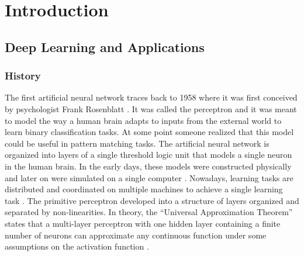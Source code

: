 
\chapter{Introduction} %

\label{Chapter1} %


\newcommand{\keyword}[1]{\textbf{#1}}
\newcommand{\tabhead}[1]{\textbf{#1}}
\newcommand{\code}[1]{\texttt{#1}}
\newcommand{\file}[1]{\texttt{\bfseries#1}}
\newcommand{\option}[1]{\texttt{\itshape#1}}


\section{Deep Learning and Applications}

\subsection{History}
The first artificial neural network traces back to 1958 where it was first conceived by psychologist Frank Rosenblatt \cite{perceptron}. It was called the perceptron and it was meant to model the way a human brain adapts to inputs from the external world to learn binary classification tasks. At some point someone realized that this model could be useful in pattern matching tasks. The artificial neural network is organized into layers of a single threshold logic unit that models a single neuron in the human brain. In the early days, these models were constructed physically and later on were simulated on a single computer \cite{mccarthy2006proposal}. Nowadays, learning tasks are distributed and coordinated on multiple machines to achieve a single learning task \cite{dean2012large}. The primitive perceptron developed into a structure of layers organized and separated by non-linearities. In theory, the “Universal Approximation Theorem” states that a multi-layer perceptron with one hidden layer containing a finite number of neurons can approximate any continuous function under some assumptions on the activation function \cite{csaji2001approximation}. 

